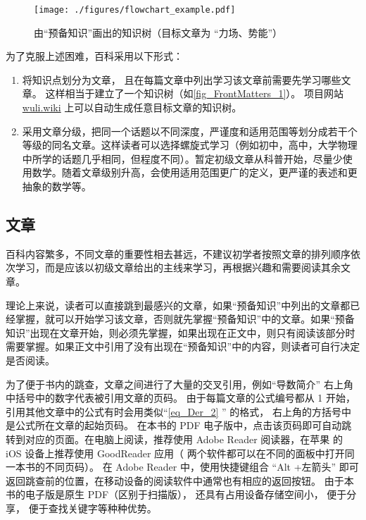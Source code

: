 \begin{figure}[ht]
\centering
\texttt{[image: ./figures/flowchart\_example.pdf]}
\caption{由“预备知识”画出的知识树（目标文章为 “力场、势能”）}\label{fig_FrontMatters_1}
\end{figure}

为了克服上述困难，百科采用以下形式：
\begin{enumerate}
\item 将知识点划分为文章， 且在每篇文章中列出学习该文章前需要先学习哪些文章。 这样相当于建立了一个知识树（如\autoref{fig_FrontMatters_1}）。 项目网站 \href{https://wuli.wiki}{wuli.wiki} 上可以自动生成任意目标文章的知识树。
\item 采用文章分级，把同一个话题以不同深度，严谨度和适用范围等划分成若干个等级的同名文章。这样读者可以选择螺旋式学习（例如初中，高中，大学物理中所学的话题几乎相同，但程度不同）。暂定初级文章从科普开始，尽量少使用数学。随着文章级别升高，会使用适用范围更广的定义，更严谨的表述和更抽象的数学等。
\end{enumerate}

\subsection{文章}
百科内容繁多，不同文章的重要性相去甚远，不建议初学者按照文章的排列顺序依次学习，而是应该以初级文章给出的主线来学习，再根据兴趣和需要阅读其余文章。

理论上来说，读者可以直接跳到最感兴的文章，如果“预备知识”中列出的文章都已经掌握，就可以开始学习该文章，否则就先掌握“预备知识”中的文章。如果“预备知识”出现在文章开始，则必须先掌握，如果出现在正文中，则只有阅读该部分时需要掌握。如果正文中引用了没有出现在“预备知识”中的内容，则读者可自行决定是否阅读。

为了便于书内的跳查，文章之间进行了大量的交叉引用，例如“导数简介” 右上角中括号中的数字代表被引用文章的页码。 由于每篇文章的公式编号都从 1 开始， 引用其他文章中的公式有时会用类似“\autoref{eq_Der_2} ” 的格式， 右上角的方括号中是公式所在文章的起始页码。 在本书的 PDF 电子版中，点击该页码即可自动跳转到对应的页面。在电脑上阅读，推荐使用 Adobe Reader 阅读器，在苹果\textsuperscript{\textregistered} 的 iOS 设备上推荐使用 GoodReader 应用（ 两个软件都可以在不同的面板中打开同一本书的不同页码）。 在 Adobe Reader 中，使用快捷键组合 “Alt +左箭头” 即可返回跳查前的位置，在移动设备的阅读软件中通常也有相应的返回按钮。 由于本书的电子版是原生 PDF（区别于扫描版）， 还具有占用设备存储空间小， 便于分享， 便于查找关键字等种种优势。
